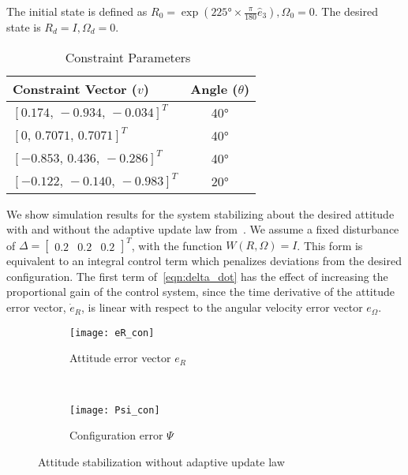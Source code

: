\documentclass[letterpaper, 10 pt, conference]{ieeeconf}  %
\begin{document}
The initial state is defined as \(R_0 =  \exp(\ang{225} \times \frac{\pi}{180} \hat{e}_3), \Omega_0 = 0\). 
The desired state is \( R_d = I,\Omega_d = 0\).
\begin{table}%
\caption{Constraint Parameters~\label{tab:constraints}}
\begin{center}\begin{tabular}{lc}
Constraint Vector (\( v \)) & Angle (\( \theta \)) \\ \hline \hline 
\([0.174,\,-0.934,\, -0.034]^T\) & \ang{40} \\ \hline 
\([0 ,\, 0.7071 ,\, 0.7071]^T\) & \ang{40} \\ \hline 
\([-0.853 ,\, 0.436 ,\, -0.286]^T\) & \ang{40} \\ \hline 
\([-0.122 ,\,-0.140,\, -0.983]^T\) & \ang{20}\end{tabular} 
\end{center}
\end{table}
We show simulation results for the system stabilizing about the desired attitude with and without the adaptive update law from~.
We assume a fixed disturbance of \(\Delta = \begin{bmatrix} 0.2 & 0.2 & 0.2 \end{bmatrix}^T \), with the function \( W(R,\Omega) = I \).
This form is equivalent to an integral control term which penalizes deviations from the desired configuration.
The first term of~\cref{eqn:delta_dot} has the effect of increasing the proportional gain of the control system, since the time derivative of the attitude error vector, \( \dot{e}_{R} \), is linear with respect to the angular velocity error vector \( e_\Omega\).
\begin{figure} 
	\centering 
	\begin{subfigure}[htbp]{0.5\columnwidth} 
		\texttt{[image: eR\_con]} 
		\caption{Attitude error vector \(e_R\) } \label{fig:eR_con} 
	\end{subfigure}~ %
	\begin{subfigure}[htbp]{0.5\columnwidth} 
		\texttt{[image: Psi\_con]} 
		\caption{Configuration error \( \Psi \)} \label{fig:Psi_con} 
	\end{subfigure}
	\caption{Attitude stabilization without adaptive update law}
	\label{fig:con} 
\end{figure}
\end{document}
